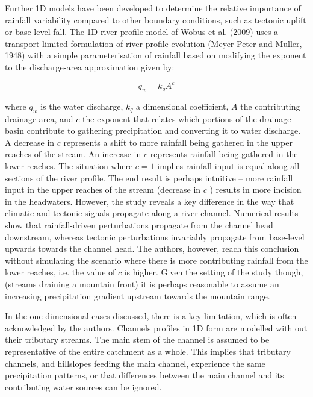 Further 1D models have been developed to determine the relative importance of rainfall variability compared to other boundary conditions, such as tectonic uplift or base level fall. The 1D river profile model of Wobus et al. (2009) uses a transport limited formulation of river profile evolution (Meyer-Peter and Muller, 1948) with a simple parameterisation of rainfall based on modifying the exponent to the discharge-area approximation given by:

\begin{equation}
q_w = k_qA^c
\end{equation}

where \(q_w\) is the water discharge, \(k_q\) a dimensional coefficient, \(A\) the contributing drainage area, and \(c\) the exponent that relates which portions of the drainage basin contribute to gathering precipitation and converting it to water discharge. A decrease in \(c\) represents a shift to more rainfall being gathered in the upper reaches of the stream. An increase in \(c\) represents rainfall being gathered in the lower reaches. The situation where \(c = 1\) implies rainfall input is equal along all sections of the river profile. The end result is perhaps intuitive -- more rainfall input in the upper reaches of the stream (decrease in \(c\) ) results in more incision in the headwaters. However, the study reveals a key difference in the way that climatic and tectonic signals propagate along a river channel. Numerical results show that rainfall-driven perturbations propagate from the channel head downstream, whereas tectonic perturbations invariably propagate from base-level upwards towards the channel head. The authors, however, reach this conclusion without simulating the scenario where there is more contributing rainfall from the lower reaches, i.e. the value of \(c\) is higher. Given the setting of the study though, (streams draining a mountain front) it is perhaps reasonable to assume an increasing precipitation gradient upstream towards the mountain range.

In the one-dimensional cases discussed, there is a key limitation, which is often acknowledged by the authors. Channels profiles in 1D form are modelled with out their tributary streams. The main stem of the channel is assumed to be representative of the entire catchment as a whole. This implies that tributary channels, and hillslopes feeding the main channel, experience the same precipitation patterns, or that differences between the main channel and its contributing water sources can be ignored. 

